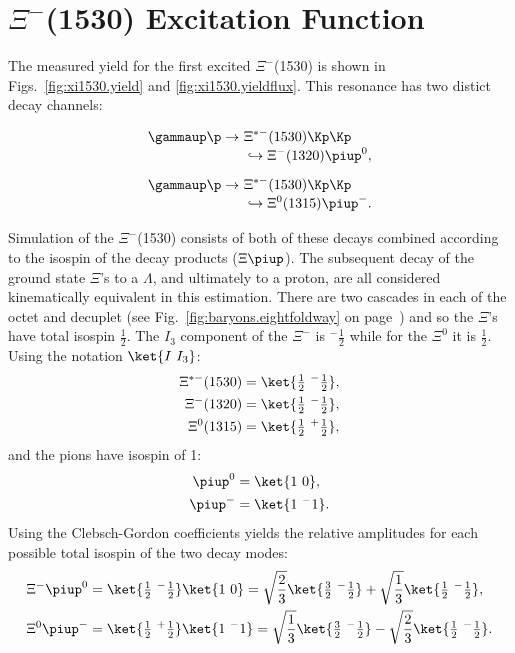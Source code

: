 \section{\label{sec:results.xi1530}\texorpdfstring{$\Xi^-$}{Xi-}(1530) Excitation Function}

The measured yield for the first excited $\Xi^-$(1530) is shown in Figs.~\ref{fig:xi1530.yield} and \ref{fig:xi1530.yieldflux}. This resonance has two distict decay channels:

\begin{singlespacing}\begin{align}
    \gammaup \p \rightarrow & \ \Xi^{*-}(1530) \Kp \Kp \nonumber \\[-0.3em]
        & \ \hookrightarrow \Xi^-(1320) \piup^0, \\[0.5em]
    \gammaup \p \rightarrow & \ \Xi^{*-}(1530) \Kp \Kp \nonumber \\[-0.3em]
        & \ \hookrightarrow \Xi^0(1315) \piup^-.
\end{align}\end{singlespacing}
Simulation of the $\Xi^-$(1530) consists of both of these decays combined according to the isospin of the decay products ($\Xi\piup$). The subsequent decay of the ground state $\Xi$'s to a $\Lambda$, and ultimately to a proton, are all considered kinematically equivalent in this estimation. There are two cascades in each of the octet and decuplet (see Fig.~\ref{fig:baryons.eightfoldway} on page~\pageref{fig:baryons.eightfoldway}) and so the $\Xi$'s have total isospin $\frac{1}{2}$. The $I_3$ component of the $\Xi^-$ is ${}^-\frac{1}{2}$ while for the $\Xi^0$ it is $\frac{1}{2}$. Using the notation $\ket{I\ I_3}$:
\begin{align}
    \Xi^{*-}(1530) & = \ket{\tfrac{1}{2}\ {}^-\tfrac{1}{2}}, \nonumber \\
    \Xi^{-}(1320) & = \ket{\tfrac{1}{2}\ {}^-\tfrac{1}{2}}, \nonumber \\
    \Xi^{0}(1315) & = \ket{\tfrac{1}{2}\ {}^+\tfrac{1}{2}},
\end{align}
and the pions have isospin of 1:
\begin{align}
    \piup^0 & = \ket{1\ 0}, \nonumber \\
    \piup^- & = \ket{1\ {}^-1}.
\end{align}
Using the Clebsch-Gordon coefficients\cite{pdg} yields the relative amplitudes for each possible total isospin of the two decay modes:
\begin{align}
    \Xi^{-}\piup^0 & = \ket{\tfrac{1}{2}\ {}^-\tfrac{1}{2}}\ket{1\ 0}
    = \sqrt{\frac{2}{3}}\ket{\tfrac{3}{2}\ {}^-\tfrac{1}{2}}
    +   \sqrt{\frac{1}{3}}\ket{\tfrac{1}{2}\ {}^-\tfrac{1}{2}}, \\
    \Xi^{0}\piup^- & = \ket{\tfrac{1}{2}\ {}^+\tfrac{1}{2}}\ket{1\ {}^-1}
    = \sqrt{\frac{1}{3}}\ket{\tfrac{3}{2}\ {}^-\tfrac{1}{2}}
    -   \sqrt{\frac{2}{3}}\ket{\tfrac{1}{2}\ {}^-\tfrac{1}{2}}.
\end{align}
